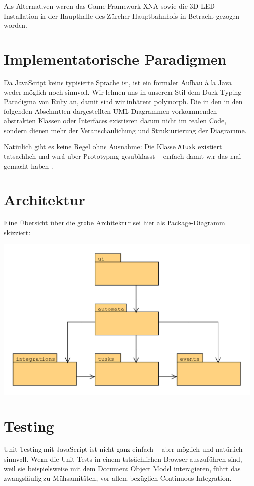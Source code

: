 \documentclass[11pt]{report} %
\theoremstyle{definition}
\begin{document}
Als Alternativen waren das Game-Framework XNA sowie die 3D-LED-Installation in der Haupthalle des Zürcher Hauptbahnhofs in Betracht gezogen worden.

\section{Implementatorische Paradigmen}

Da JavaScript keine typisierte Sprache ist, ist ein formaler Aufbau à la Java weder möglich noch sinnvoll. Wir lehnen uns in unserem Stil dem Duck-Typing-Paradigma von Ruby an, damit sind wir inhärent polymorph. Die in den in den folgenden Abschnitten dargestellten UML-Diagrammen vorkommenden abstrakten Klassen oder Interfaces existieren darum nicht im realen Code, sondern dienen mehr der Veranschaulichung und Strukturierung der Diagramme.

Natürlich gibt es keine Regel ohne Ausnahme: Die Klasse {\tt ATusk} existiert tatsächlich und wird über Prototyping gesubklasst -- einfach damit wir das mal gemacht haben \cite{OOJSone, OOJStwo, OOJSthree}.

\section{Architektur}

Eine Übersicht über die grobe Architektur sei hier als Package-Diagramm skizziert:

\includegraphics[scale=0.7]{uml/Architektur.pdf}

\section{Testing}

Unit Testing mit JavaScript ist nicht ganz einfach -- aber möglich und natürlich sinnvoll. Wenn die Unit Tests in einem tatsächlichen Browser auszuführen sind, weil sie beispielsweise mit dem Document Object Model interagieren, führt das zwangsläufig zu Mühsamitäten, vor allem bezüglich Continuous Integration.
\end{document}
